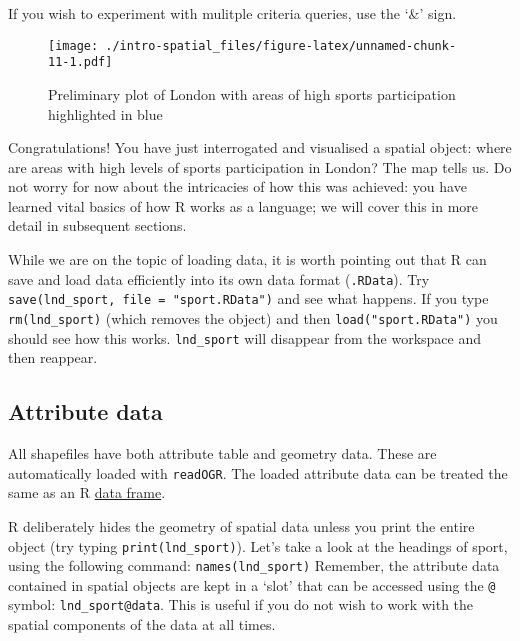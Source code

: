 \documentclass[]{article}
\newenvironment{Shaded}{}{}
\newcommand{\KeywordTok}[1]{\textcolor[rgb]{0.00,0.44,0.13}{\textbf{{#1}}}}
\newcommand{\DataTypeTok}[1]{\textcolor[rgb]{0.56,0.13,0.00}{{#1}}}
\newcommand{\DecValTok}[1]{\textcolor[rgb]{0.25,0.63,0.44}{{#1}}}
\newcommand{\StringTok}[1]{\textcolor[rgb]{0.25,0.44,0.63}{{#1}}}
\newcommand{\CommentTok}[1]{\textcolor[rgb]{0.38,0.63,0.69}{\textit{{#1}}}}
\newcommand{\OtherTok}[1]{\textcolor[rgb]{0.00,0.44,0.13}{{#1}}}
\newcommand{\NormalTok}[1]{{#1}}
\begin{document}
If you wish to experiment with mulitple criteria queries, use the `\&'
sign.

\begin{Shaded}
\end{Shaded}

\begin{figure}[htbp]
\centering
\texttt{[image: ./intro-spatial\_files/figure-latex/unnamed-chunk-11-1.pdf]}
\caption{Preliminary plot of London with areas of high sports
participation highlighted in blue}
\end{figure}

Congratulations! You have just interrogated and visualised a spatial
object: where are areas with high levels of sports participation in
London? The map tells us. Do not worry for now about the intricacies of
how this was achieved: you have learned vital basics of how R works as a
language; we will cover this in more detail in subsequent sections.

While we are on the topic of loading data, it is worth pointing out that
R can save and load data efficiently into its own data format
(\texttt{.RData}). Try \texttt{save(lnd\_sport, file = "sport.RData")}
and see what happens. If you type \texttt{rm(lnd\_sport)} (which removes
the object) and then \texttt{load("sport.RData")} you should see how
this works. \texttt{lnd\_sport} will disappear from the workspace and
then reappear.

\subsection{Attribute data}\label{attribute-data}

All shapefiles have both attribute table and geometry data. These are
automatically loaded with \texttt{readOGR}. The loaded attribute data
can be treated the same as an R
\href{http://www.statmethods.net/input/datatypes.html}{data frame}.

R deliberately hides the geometry of spatial data unless you print the
entire object (try typing \texttt{print(lnd\_sport)}). Let's take a look
at the headings of sport, using the following command:
\texttt{names(lnd\_sport)} Remember, the attribute data contained in
spatial objects are kept in a `slot' that can be accessed using the
\texttt{@} symbol: \texttt{lnd\_sport@data}. This is useful if you do
not wish to work with the spatial components of the data at all times.
\end{document}
